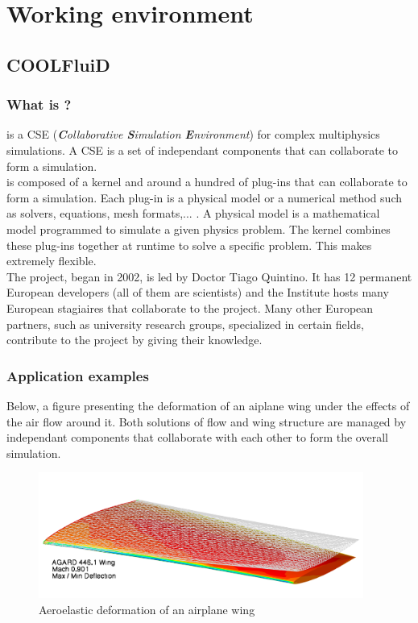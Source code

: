 \chapter{Working environment}

\section{COOLFluiD}

\subsection{What is \cf ?}

\cf is a CSE (\textit{\textbf{C}ollaborative \textbf{S}imulation
\textbf{E}nvironment}) for complex multiphysics simulations. A CSE is a set of
independant components that can collaborate to form a simulation.\\

\cf is composed of a kernel and around a hundred of plug-ins that can
collaborate to form a simulation. Each plug-in is a physical model or a
numerical method such as solvers, equations, mesh formats,... . A physical
model is a mathematical model programmed to simulate a given physics problem.
The kernel combines these plug-ins together at runtime to solve a specific
problem. This makes \cf extremely flexible.\\

The project, began in 2002, is led by Doctor Tiago Quintino. It has 12
permanent European developers (all of them are scientists) and the Institute
hosts many European stagiaires that collaborate to the project. Many other
European partners, such as university research groups, specialized in certain
fields, contribute to the project by giving their knowledge.\\

\subsection{Application examples}

Below, a figure presenting the deformation of an aiplane wing under the
effects of the air flow around it. Both solutions of flow and wing structure
are managed by independant components that collaborate with each other to form
the overall simulation.

\begin{figure}[H]
 \begin{center}
  \includegraphics[width=0.95\textwidth]{images/agard_wing}
 \end{center}
\caption{Aeroelastic deformation of an airplane wing}
\end{figure}

